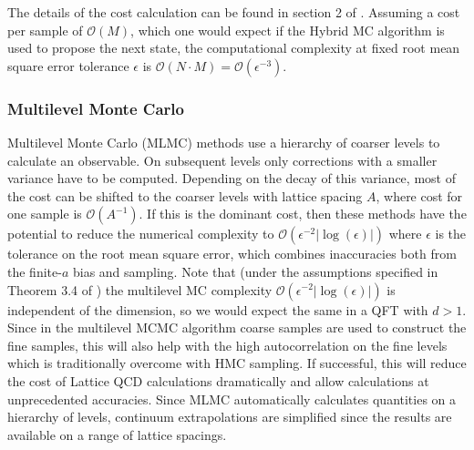 \documentclass[11pt]{article}
\begin{document}
The details of the cost calculation can be found in section 2 of \cite{Dodwell2015}. Assuming a cost per sample of $\mathcal{O}(M)$, which one would expect if the Hybrid MC algorithm is used to propose the next state, the computational complexity at fixed root mean square error tolerance $\epsilon$ is $\mathcal{O}(N\cdot M)=\mathcal{O}(\epsilon^{-3})$.
\subsubsection{Multilevel Monte Carlo}
Multilevel Monte Carlo (MLMC) methods \cite{Heinrich2001,Giles2008,Giles2015} use a hierarchy of coarser levels to calculate an observable. On subsequent levels only corrections with a smaller variance have to be computed. Depending on the decay of this variance, most of the cost can be shifted to the coarser levels with lattice spacing $A$, where cost for one sample is $\mathcal{O}(A^{-1})$. If this is the dominant cost, then these methods have the potential to reduce the numerical complexity to $\mathcal{O}(\epsilon^{-2}|\log(\epsilon)|)$ where $\epsilon$ is the tolerance on the root mean square error, which combines inaccuracies both from the finite-$a$ bias and sampling. Note that (under the assumptions specified in Theorem 3.4 of \cite{Dodwell2015}) the multilevel MC complexity $\mathcal{O}(\epsilon^{-2}|\log(\epsilon)|)$ is independent of the dimension, so we would expect the same in a QFT with $d>1$. Since in the multilevel MCMC algorithm \cite{Dodwell2015} coarse samples are used to construct the fine samples, this will also help with the high autocorrelation on the fine levels which is traditionally overcome with HMC sampling. If successful, this will reduce the cost of Lattice QCD calculations dramatically and allow calculations at unprecedented accuracies. Since MLMC automatically calculates quantities on a hierarchy of levels, continuum extrapolations are simplified since the results are available on a range of lattice spacings.
\end{document}
